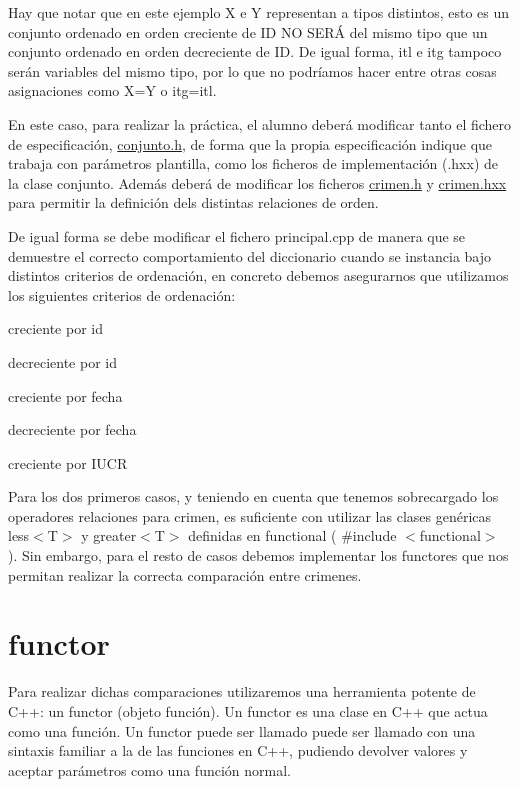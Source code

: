 Hay que notar que en este ejemplo X e Y representan a tipos distintos, esto es un conjunto ordenado en orden creciente de I\-D N\-O S\-E\-RÁ del mismo tipo que un conjunto ordenado en orden decreciente de I\-D. De igual forma, itl e itg tampoco serán variables del mismo tipo, por lo que no podríamos hacer entre otras cosas asignaciones como X=Y o itg=itl.

En este caso, para realizar la práctica, el alumno deberá modificar tanto el fichero de especificación, \hyperlink{conjunto_8h_source}{conjunto.\-h}, de forma que la propia especificación indique que trabaja con parámetros plantilla, como los ficheros de implementación (.hxx) de la clase conjunto. Además deberá de modificar los ficheros \hyperlink{crimen_8h_source}{crimen.\-h} y \hyperlink{crimen_8hxx_source}{crimen.\-hxx} para permitir la definición dels distintas relaciones de orden.

De igual forma se debe modificar el fichero principal.\-cpp de manera que se demuestre el correcto comportamiento del diccionario cuando se instancia bajo distintos criterios de ordenación, en concreto debemos asegurarnos que utilizamos los siguientes criterios de ordenación\-:

\begin{DoxyItemize}
\item creciente por id \item decreciente por id \item creciente por fecha \item decreciente por fecha \item creciente por I\-U\-C\-R\end{DoxyItemize}
Para los dos primeros casos, y teniendo en cuenta que tenemos sobrecargado los operadores relaciones para crimen, es suficiente con utilizar las clases genéricas less$<$\-T$>$ y greater$<$\-T$>$ definidas en functional ( \#include $<$functional$>$ ). Sin embargo, para el resto de casos debemos implementar los functores que nos permitan realizar la correcta comparación entre crimenes.\hypertarget{index_functor}{}\section{functor}\label{index_functor}
Para realizar dichas comparaciones utilizaremos una herramienta potente de C++\-: un functor (objeto función). Un functor es una clase en C++ que actua como una función. Un functor puede ser llamado puede ser llamado con una sintaxis familiar a la de las funciones en C++, pudiendo devolver valores y aceptar parámetros como una función normal.

